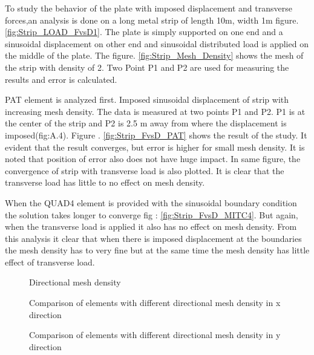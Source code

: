 \documentclass[main.tex]{subfiles}
\begin{document}
To study the behavior of the plate with imposed displacement and transverse forces,an analysis is done on a long metal strip of length 10m, width 1m figure. \ref{fig:Strip_LOAD_FvsD1}. The plate is simply supported on  one end and a sinusoidal displacement on other end and sinusoidal distributed load is applied on the middle of the plate. The figure. \ref{fig:Strip_Mesh_Density} shows the mesh of the strip with density of 2. Two Point P1 and P2 are used for measuring the results and error is calculated. 





PAT element is analyzed first. Imposed sinusoidal displacement of strip with increasing mesh density. The data is measured at two points P1 and P2. P1 is at the center of the strip and P2 is 2.5 m away from where the displacement is imposed(fig:A.4). Figure .  \ref{fig:Strip_FvsD_PAT} shows the result of the study. It evident that the result converges, but error is higher for small mesh density. It is noted that position of error also does not have huge impact. In same figure, the convergence of strip with transverse load is also plotted. It is clear that the transverse load has little to no effect on mesh density. 


When the QUAD4 element is provided with the sinusoidal boundary condition the solution takes longer to converge fig : \ref{fig:Strip_FvsD_MITC4}. But again, when the transverse load is applied it also has no effect on mesh density. From this analysis it clear that when there is imposed displacement at the boundaries the mesh density has to very fine but at the same time the mesh density has little effect of transverse load. 

\begin{figure}[h]
\centering

\caption{Directional mesh density}
\label{fig:Mesh_Density_NbvsNl}
\end{figure}
\begin{figure}[h]
\centering

\caption{Comparison of elements with different directional mesh density in x direction}
\label{fig:Strip_nlvsnb_nb}
\end{figure}
\begin{figure}[h!]

\caption{Comparison of elements with different directional mesh density in y direction}
\label{fig:Strip_nlvsnb_nl}
\end{figure}
\end{document}
